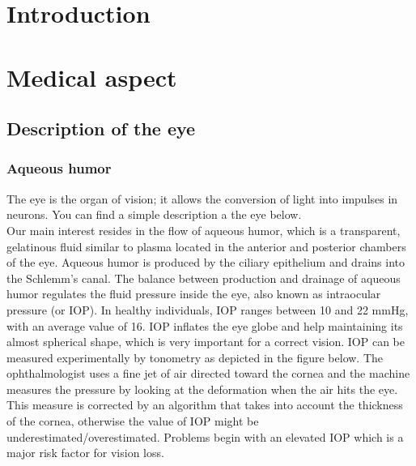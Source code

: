 \documentclass[english,12pt]{article}
\begin{document}
\vskip25mm
\section{Introduction}\label{S1}

\section{Medical aspect}\label{s2}
\subsection{Description of the eye}
\subsubsection{Aqueous humor }
The eye is the organ of vision; it allows the conversion of light into impulses in neurons. You can find a simple description a the eye below.\\
Our main interest resides in the flow of aqueous humor, which is a transparent, gelatinous fluid similar to plasma located in the anterior and posterior chambers of the eye. Aqueous humor is produced by the ciliary epithelium and drains into the Schlemm's canal. The balance between production and drainage of aqueous humor regulates the fluid pressure inside the eye, also known as intraocular pressure (or IOP). 
In healthy individuals, IOP ranges between 10 and 22 mmHg, with an average value of 16. 
IOP inflates the eye globe and help maintaining its almost spherical shape, which is very important for a correct vision. 
IOP can be measured experimentally by tonometry as depicted in the figure below.
 The ophthalmologist uses a fine jet of air directed toward the cornea and the machine measures the pressure by looking at the deformation when the air hits the eye. This measure is corrected by an algorithm that takes into account the thickness of the cornea, otherwise the value of IOP might be underestimated/overestimated.
Problems begin with an elevated IOP which is a major risk factor for vision loss.
\end{document}
